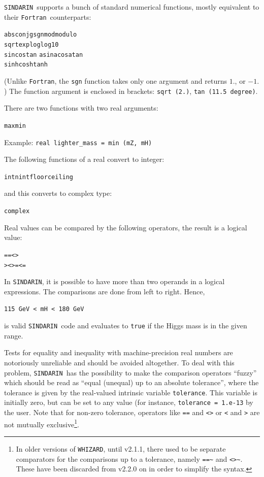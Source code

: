\documentclass[12pt]{book}
\newcommand{\ttt}[1]{\texttt{#1}}
\newcommand{\whizard}{\ttt{WHIZARD}}
\newcommand{\sindarin}{\ttt{SINDARIN}}
\newcommand{\fortran}{\ttt{Fortran}}
\begin{document}
\sindarin\ supports a bunch of standard numerical functions, mostly equivalent
to their \fortran\ counterparts:
\begin{center}
  \ttt{abs}\quad \ttt{conjg}\quad \ttt{sgn}\quad \ttt{mod}\quad \ttt{modulo}
\\
  \ttt{sqrt}\quad \ttt{exp}\quad \ttt{log}\quad \ttt{log10}
\\
  \ttt{sin}\quad \ttt{cos}\quad \ttt{tan}\quad
  \ttt{asin}\quad \ttt{acos}\quad \ttt{atan}
\\
  \ttt{sinh}\quad \ttt{cosh}\quad \ttt{tanh}
\end{center}
(Unlike \fortran, the \ttt{sgn} function takes only one argument and returns
$1.$, or $-1.$) The function argument is enclosed in brackets: \ttt{sqrt
  (2.)}, \ttt{tan (11.5 degree)}.

There are two functions with two real arguments:
\begin{center}
  \ttt{max}\quad \ttt{min}
\end{center}
Example: \verb|real lighter_mass = min (mZ, mH)|

The following functions of a real convert to integer:
\begin{center}
  \ttt{int}\quad \ttt{nint}\quad \ttt{floor}\quad \ttt{ceiling} %
\end{center}
and this converts to complex type:
\begin{center}
  \ttt{complex}
\end{center}

Real values can be compared by the following operators, the result is a
logical value:
\begin{center}
  \verb|==|\quad \verb|<>|
\\
  \verb|>|\quad \verb|<|\quad \verb|>=|\quad \verb|<=|
\end{center}
In \sindarin, it is possible to have more than two operands in a logical
expressions.  The comparisons are done from left to right.  Hence,
\begin{center}
  \verb|115 GeV < mH < 180 GeV|
\end{center}
is valid \sindarin\ code and evaluates to \ttt{true} if the Higgs mass is in the
given range.

Tests for equality and inequality with machine-precision real numbers are
notoriously unreliable and should be avoided altogether.  To deal with this
problem, \sindarin\ has the possibility to make the comparison operators
``fuzzy'' which should be read as ``equal (unequal) up to an absolute
tolerance'', where the tolerance is given by the real-valued intrinsic
variable \ttt{tolerance}. This variable is initially zero, but can be
set to any value (for instance, \ttt{tolerance = 1.e-13} by the user.
Note that for non-zero tolerance, operators like
\verb|==| and \verb|<>| or \verb|<| and \verb|>| are not mutually
exclusive\footnote{In older versions of \whizard, until v2.1.1, there
used to be separate comparators for the comparisons up to a tolerance,
namely \ttt{==\~{}} and \ttt{<>\~{}}. These have been discarded from
v2.2.0 on in order to simplify the syntax.}.
\end{document}
